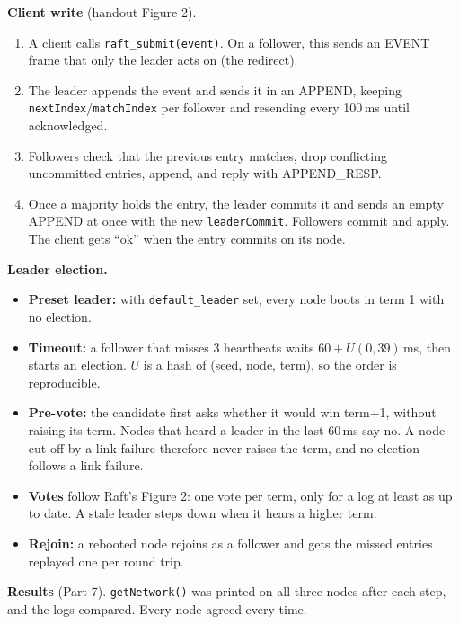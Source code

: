 \documentclass[10pt]{article}
\begin{document}
\textbf{Client write} (handout Figure 2).
\begin{enumerate}
  \item A client calls \texttt{raft\_submit(event)}. On a follower, this sends an EVENT frame that only the leader acts on (the redirect).
  \item The leader appends the event and sends it in an APPEND, keeping \texttt{nextIndex}/\texttt{matchIndex} per follower and resending every 100\,ms until acknowledged.
  \item Followers check that the previous entry matches, drop conflicting uncommitted entries, append, and reply with APPEND\_RESP.
  \item Once a majority holds the entry, the leader commits it and sends an empty APPEND at once with the new \texttt{leaderCommit}. Followers commit and apply. The client gets ``ok'' when the entry commits on its node.
\end{enumerate}

\textbf{Leader election.}
\begin{itemize}
  \item \textbf{Preset leader:} with \texttt{default\_leader} set, every node boots in term 1 with no election.
  \item \textbf{Timeout:} a follower that misses 3 heartbeats waits $60 + U(0,39)$\,ms, then starts an election. $U$ is a hash of (seed, node, term), so the order is reproducible.
  \item \textbf{Pre-vote:} the candidate first asks whether it would win term+1, without raising its term. Nodes that heard a leader in the last 60\,ms say no. A node cut off by a link failure therefore never raises the term, and no election follows a link failure.
  \item \textbf{Votes} follow Raft's Figure 2: one vote per term, only for a log at least as up to date. A stale leader steps down when it hears a higher term.
  \item \textbf{Rejoin:} a rebooted node rejoins as a follower and gets the missed entries replayed one per round trip.
\end{itemize}

\textbf{Results} (Part 7). \texttt{getNetwork()} was printed on all three nodes after each step, and the logs compared. Every node agreed every time.
\end{document}
